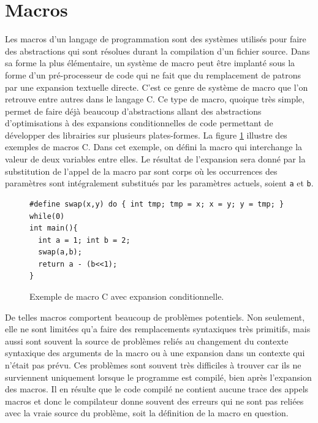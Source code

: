 \documentclass[12pt,twoside,letterpaper,francais]{book}
\newcommand{\scheme}[1]{\selectlanguage{english}{\tt #1}\selectlanguage{french}}
\begin{document}
\FloatBarrier
\section{Macros} \label{Scheme:macros}
Les macros d'un langage de programmation sont des systèmes utilisés
pour faire des abstractions qui sont résolues durant la compilation
d'un fichier source. Dans sa forme la plus élémentaire, un système de
macro peut être implanté sous la forme d'un pré-processeur de code qui
ne fait que du remplacement de patrons par une expansion textuelle
directe. C'est ce genre de système de macro que l'on retrouve entre
autres dans le langage C. Ce type de macro, quoique très simple,
permet de faire déjà beaucoup d'abstractions allant des abstractions
d'optimisations à des expansions conditionnelles de code permettant de
développer des librairies sur plusieurs plates-formes. La figure
\ref{Scheme:c-macros} illustre des exemples de macros C. Dans cet
exemple, on défini la macro \scheme{swap} qui interchange la valeur de
deux variables entre elles. Le résultat de l'expansion sera donné par
la substitution de l'appel de la macro par sont corps où les
occurrences des paramètres sont intégralement substitués par les
paramètres actuels, soient \texttt{a} et \texttt{b}.

\begin{figure}[htb!]
  \begin{verbatim}
#define swap(x,y) do { int tmp; tmp = x; x = y; y = tmp; } while(0)
int main(){
  int a = 1; int b = 2;
  swap(a,b);
  return a - (b<<1);
}
  \end{verbatim}
  \caption{Exemple de macro C avec expansion conditionnelle.}
  \label{Scheme:c-macros}
\end{figure}

De telles macros comportent beaucoup de problèmes potentiels. Non
seulement, elle ne sont limitées qu'a faire des remplacements
syntaxiques très primitifs, mais aussi sont souvent la source de
problèmes reliés au changement du contexte syntaxique des arguments de
la macro ou à une expansion dans un contexte qui n'était pas
prévu. Ces problèmes sont souvent très difficiles à trouver car ils ne
surviennent uniquement lorsque le programme est compilé, bien après
l'expansion des macros. Il en résulte que le code compilé ne contient
aucune trace des appels macros et donc le compilateur donne souvent
des erreurs qui ne sont pas reliées avec la vraie source du problème,
soit la définition de la macro en question.
\end{document}
